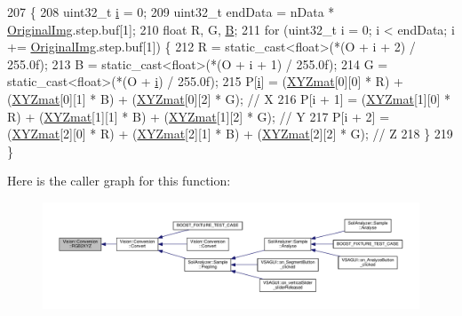 \begin{DoxyCode}
207                                                       \{
208   uint32\_t \hyperlink{_comparision_pictures_2_createtest_image_8m_a6f6ccfcf58b31cb6412107d9d5281426}{i} = 0;
209   uint32\_t endData = nData * \hyperlink{class_vision_1_1_image_processing_a77c370dab270158a4e9c634e2d3f48e7}{OriginalImg}.step.buf[1];
210   \textcolor{keywordtype}{float} R, G, \hyperlink{struct_b}{B};
211   \textcolor{keywordflow}{for} (uint32\_t i = 0; i < endData; i += \hyperlink{class_vision_1_1_image_processing_a77c370dab270158a4e9c634e2d3f48e7}{OriginalImg}.step.buf[1]) \{
212     R = \textcolor{keyword}{static\_cast<}\textcolor{keywordtype}{float}\textcolor{keyword}{>}(*(O + i + 2) / 255.0f);
213     B = \textcolor{keyword}{static\_cast<}\textcolor{keywordtype}{float}\textcolor{keyword}{>}(*(O + i + 1) / 255.0f);
214     G = \textcolor{keyword}{static\_cast<}\textcolor{keywordtype}{float}\textcolor{keyword}{>}(*(O + \hyperlink{_comparision_pictures_2_createtest_image_8m_a6f6ccfcf58b31cb6412107d9d5281426}{i}) / 255.0f);
215     P[\hyperlink{_comparision_pictures_2_createtest_image_8m_a6f6ccfcf58b31cb6412107d9d5281426}{i}] = (\hyperlink{class_vision_1_1_conversion_ad0c6e6c63380927c63da7f967b5e61d1}{XYZmat}[0][0] * R) + (\hyperlink{class_vision_1_1_conversion_ad0c6e6c63380927c63da7f967b5e61d1}{XYZmat}[0][1] * B) + (\hyperlink{class_vision_1_1_conversion_ad0c6e6c63380927c63da7f967b5e61d1}{XYZmat}[0][2] * G); \textcolor{comment}{// X}
216     P[i + 1] = (\hyperlink{class_vision_1_1_conversion_ad0c6e6c63380927c63da7f967b5e61d1}{XYZmat}[1][0] * R) + (\hyperlink{class_vision_1_1_conversion_ad0c6e6c63380927c63da7f967b5e61d1}{XYZmat}[1][1] * B) + (\hyperlink{class_vision_1_1_conversion_ad0c6e6c63380927c63da7f967b5e61d1}{XYZmat}[1][2] * G); \textcolor{comment}{// Y}
217     P[i + 2] = (\hyperlink{class_vision_1_1_conversion_ad0c6e6c63380927c63da7f967b5e61d1}{XYZmat}[2][0] * R) + (\hyperlink{class_vision_1_1_conversion_ad0c6e6c63380927c63da7f967b5e61d1}{XYZmat}[2][1] * B) + (\hyperlink{class_vision_1_1_conversion_ad0c6e6c63380927c63da7f967b5e61d1}{XYZmat}[2][2] * G); \textcolor{comment}{// Z}
218   \}
219 \}
\end{DoxyCode}


Here is the caller graph for this function\+:\nopagebreak
\begin{figure}[H]
\begin{center}
\leavevmode
\includegraphics[width=350pt]{class_vision_1_1_conversion_afe7b24da82f77ff1116f8bc3d0a62fcc_icgraph}
\end{center}
\end{figure}


